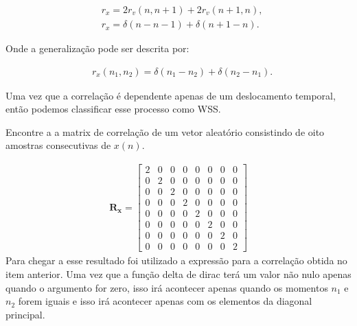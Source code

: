 \begin{align}
    &r_{x} = 2r_{v}(n,n+1) + 2r_{v}(n+1,n), \\
    &r_{x} = \delta(n - n - 1) + \delta(n + 1 - n).
\end{align}

Onde a generalização pode ser descrita por:

\begin{align}
    &r_{x}(n_{1}, n_{2})= \delta(n_{1} - n_{2}) + \delta(n_{2} - n_{1}).  
\end{align}

Uma vez que a correlação é dependente apenas de um deslocamento temporal, então podemos classificar esse processo como WSS.

 Encontre a a matrix de correlação de um vetor aleatório consistindo de oito amostras consecutivas de
$x(n)$.



\begin{align}
    \mathbf{R}_{\mathbf{x}} = \left[
    \begin{matrix}
        2 & 0 & 0 & 0 & 0 & 0 & 0 & 0\\
        0 & 2 & 0 & 0 & 0 & 0 & 0 & 0\\
        0 & 0 & 2 & 0 & 0 & 0 & 0 & 0\\
        0 & 0 & 0 & 2 & 0 & 0 & 0 & 0\\
        0 & 0 & 0 & 0 & 2 & 0 & 0 & 0\\
        0 & 0 & 0 & 0 & 0 & 2 & 0 & 0\\
        0 & 0 & 0 & 0 & 0 & 0 & 2 & 0\\
        0 & 0 & 0 & 0 & 0 & 0 & 0 & 2
    \end{matrix}
    \right]
\end{align}
Para chegar a esse resultado foi utilizado a expressão para a correlação obtida no item anterior. Uma vez que a função delta de dirac terá um valor não nulo apenas quando o argumento for zero, isso irá acontecer apenas quando os momentos $n_{1}$ e $n_{2}$ forem iguais e isso irá acontecer apenas com os elementos da diagonal principal.

